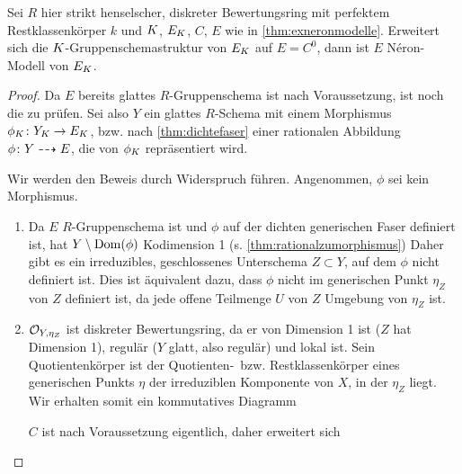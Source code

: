 \documentclass[german]{scrreprt}
\begin{document}
\begin{Lemma}\label{thm:fallstriktehenselisierung}
  Sei $R$ hier strikt henselscher, diskreter Bewertungsring mit
  perfektem Restklassenkörper $k$
  und $K$, $E_{K}$, $C$, $E$ wie in \autoref{thm:exneronmodelle}.
  Erweitert sich die $K$-Gruppenschemastruktur von $E_{K}$ auf
  $E=C^0$, dann ist $E$ Néron-Modell von $E_{K}$.
  \begin{proof}
    Da $E$ bereits glattes $R$-Gruppenschema ist nach Voraussetzung,
    ist noch die \NAbbEig zu prüfen.
    Sei also $Y$ ein glattes $R$-Schema mit einem Morphismus
    $\phi_{K}\colon Y_{K}\to E_{K}$, bzw. nach \autoref{thm:dichtefaser}
    einer rationalen Abbildung $\phi\colon Y\dashrightarrow E$, die von $\phi_{K}$
    repräsentiert wird.

    Wir werden den Beweis durch Widerspruch führen.
    Angenommen, $\phi$ sei kein Morphismus.
    \begin{enumerate}
    \item Da $E$ $R$-Gruppenschema ist und $\phi$ auf der dichten
      generischen Faser definiert ist, hat $Y\setminus\operatorname{Dom}(\phi)$
      Kodimension 1 (s. \autoref{thm:rationalzumorphismus})
      Daher gibt es ein irreduzibles, geschlossenes Unterschema
      $Z\subset Y$, auf dem $\phi$ nicht definiert ist.
      Dies ist äquivalent dazu, dass $\phi$ nicht im generischen Punkt
      $\eta_Z$ von $Z$ definiert ist, da jede offene Teilmenge $U$ von
      $Z$ Umgebung von $\eta_Z$ ist.
    \item $\mathcal{O}_{Y,\eta_Z}$ ist diskreter Bewertungsring, da er von
      Dimension 1 ist ($Z$ hat Dimension 1), regulär ($Y$ glatt, also
      regulär) und lokal ist.
      Sein Quotientenkörper ist der Quotienten-~bzw. Restklassenkörper
      eines generischen Punkts $\eta$ der irreduziblen Komponente von
      $X$, in der $\eta_Z$ liegt. Wir erhalten somit ein kommutatives
      Diagramm
      \begin{center}
      \end{center}
      $C$ ist nach Voraussetzung eigentlich, daher erweitert sich

\end{enumerate}
\end{proof}
\end{Lemma}
\end{document}
